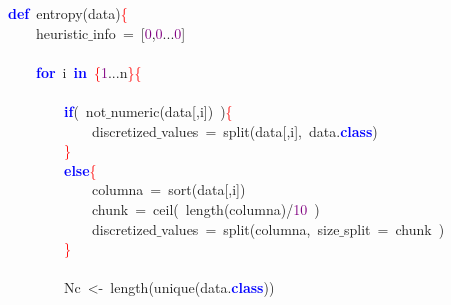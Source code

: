 \noindent
\mbox{}\textbf{\textcolor{Blue}{def}}\ entropy\textcolor{BrickRed}{(}data\textcolor{BrickRed}{)}\textcolor{Red}{\{} \\
\mbox{}\ \ \ \ heuristic$\_$info\ \textcolor{BrickRed}{=}\ \textcolor{BrickRed}{[}\textcolor{Purple}{0}\textcolor{BrickRed}{,}\textcolor{Purple}{0}\textcolor{BrickRed}{...}\textcolor{Purple}{0}\textcolor{BrickRed}{]} \\
\mbox{} \\
\mbox{}\ \ \ \ \textbf{\textcolor{Blue}{for}}\ i\ \textbf{\textcolor{Blue}{in}}\ \textcolor{Red}{\{}\textcolor{Purple}{1}\textcolor{BrickRed}{...}n\textcolor{Red}{\}\{} \\
\mbox{} \\
\mbox{}\ \ \ \ \ \ \ \ \textbf{\textcolor{Blue}{if}}\textcolor{BrickRed}{(}\ not$\_$numeric\textcolor{BrickRed}{(}data\textcolor{BrickRed}{[,}i\textcolor{BrickRed}{])}\ \textcolor{BrickRed}{)}\textcolor{Red}{\{} \\
\mbox{}\ \ \ \ \ \ \ \ \ \ \ \ discretized$\_$values\ \textcolor{BrickRed}{=}\ split\textcolor{BrickRed}{(}data\textcolor{BrickRed}{[,}i\textcolor{BrickRed}{],}\ data\textcolor{BrickRed}{.}\textbf{\textcolor{Blue}{class}}\textcolor{BrickRed}{)} \\
\mbox{}\ \ \ \ \ \ \ \ \textcolor{Red}{\}} \\
\mbox{}\ \ \ \ \ \ \ \ \textbf{\textcolor{Blue}{else}}\textcolor{Red}{\{} \\
\mbox{}\ \ \ \ \ \ \ \ \ \ \ \ columna\ \textcolor{BrickRed}{=}\ sort\textcolor{BrickRed}{(}data\textcolor{BrickRed}{[,}i\textcolor{BrickRed}{])} \\
\mbox{}\ \ \ \ \ \ \ \ \ \ \ \ chunk\ \textcolor{BrickRed}{=}\ ceil\textcolor{BrickRed}{(}\ length\textcolor{BrickRed}{(}columna\textcolor{BrickRed}{)/}\textcolor{Purple}{10}\ \textcolor{BrickRed}{)} \\
\mbox{}\ \ \ \ \ \ \ \ \ \ \ \ discretized$\_$values\ \textcolor{BrickRed}{=}\ split\textcolor{BrickRed}{(}columna\textcolor{BrickRed}{,}\ size$\_$split\ \textcolor{BrickRed}{=}\ chunk\ \textcolor{BrickRed}{)} \\
\mbox{}\ \ \ \ \ \ \ \ \textcolor{Red}{\}} \\
\mbox{} \\
\mbox{}\ \ \ \ \ \ \ \ Nc\ \textcolor{BrickRed}{\textless{}-}\ length\textcolor{BrickRed}{(}unique\textcolor{BrickRed}{(}data\textcolor{BrickRed}{.}\textbf{\textcolor{Blue}{class}}\textcolor{BrickRed}{))} \\
